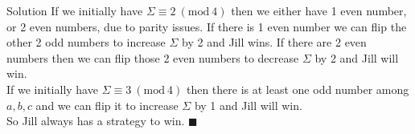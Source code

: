 \documentclass{article}
\begin{document}
\begin{solution}{Solution}
If we initially have $\Sigma \equiv 2 \ (\text{mod} \ 4)$ then we either
have 1 even number, or 2 even numbers, due to parity issues. If there is 1
even number we can flip the other 2 odd numbers to increase $\Sigma$ by 2
and Jill wins. If there are 2 even numbers then we can flip those 2 even
numbers to decrease $\Sigma$ by 2 and Jill will win. \\

If we initially have $\Sigma \equiv 3 \ (\text{mod} \ 4)$ then there is at
least one odd number among $a,b,c$ and we can flip it to increase $\Sigma$
by 1 and Jill will win.\\

So Jill always has a strategy to win. $\blacksquare$
\end{solution}
\end{document}

